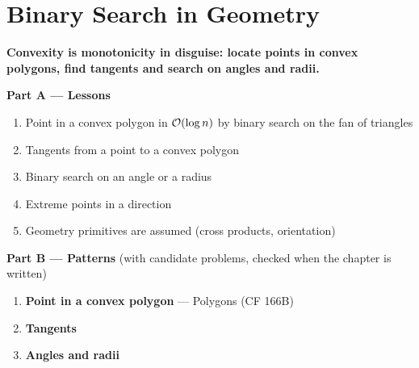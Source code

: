 \chapter{Binary Search in Geometry}
\label{ch:geometry}

\begin{tcolorbox}[enhanced, colback=white, colframe=secondaryblue, boxrule=1pt, arc=2mm]
\textbf{\large\textcolor{primaryblue}{Convexity is monotonicity in disguise: locate points in convex polygons, find tangents and search on angles and radii.}}
\end{tcolorbox}


\begin{plannedbox}
\textbf{Part A --- Lessons}
\begin{enumerate}[leftmargin=*, label=\textbf{A\arabic*.}, itemsep=1pt]
    \item Point in a convex polygon in $\mathcal{O}(\log n)$ by binary search on the fan of triangles
    \item Tangents from a point to a convex polygon
    \item Binary search on an angle or a radius
    \item Extreme points in a direction
    \item Geometry primitives are assumed (cross products, orientation)
\end{enumerate}
\textbf{Part B --- Patterns} (with candidate problems, checked when the chapter is written)
\begin{enumerate}[leftmargin=*, label=\textbf{P\arabic*.}, itemsep=1pt]
    \item \textbf{Point in a convex polygon} --- Polygons {\small\color{darkgray}(CF 166B)}
    \item \textbf{Tangents}
    \item \textbf{Angles and radii}
\end{enumerate}
\end{plannedbox}
